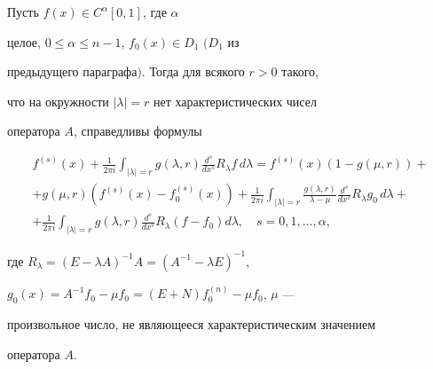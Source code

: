\begin{lem}


Пусть $f(x)\in C^\alpha[0,1]$, где $\alpha$


целое, $0\le\alpha\le n-1$, $f_0(x)\in D_1$ $(D_1$ из


предыдущего параграфа\/$)$. Тогда для всякого $r>0$ такого,


что на окружности $|\lambda|=r$ нет характеристических чисел


оператора $A$, справедливы формулы


\begin{multline}


f^{(s)}(x)+ \frac 1{2\pi i}\int_{|\lambda|=r}


g(\lambda,r) \frac {d^s}{dx^s}R_\lambda f\,d\lambda=f^{(s)}(x)


(1-g(\mu,r))+\\


%


+g(\mu,r)(f^{(s)}(x)-f_0^{(s)}(x))+ \frac 1{2\pi i}\int


_{|\lambda|=r}\frac {g(\lambda,r)}{\lambda-\mu} \frac {d^s}


{dx^s}R_\lambda g_0\,d\lambda+\\


%


+\frac 1{2\pi i}\int_{|\lambda|=r}g(\lambda,r) \frac {d^s}


{dx^s}R_\lambda(f-f_0)d\lambda,\quad s=0,1,\dotsc,\alpha,


\end{multline}


где $R_\lambda=(E-\lambda A)^{-1}A=(A^{-1}-\lambda E)^{-1}$,


$g_0(x)=A^{-1}f_0-\mu f_0=(E+N)f_0^{(n)}-\mu f_0$, $\mu$ ---


произвольное число, не являющееся характеристическим значением


оператора $A$.


\end{lem}






